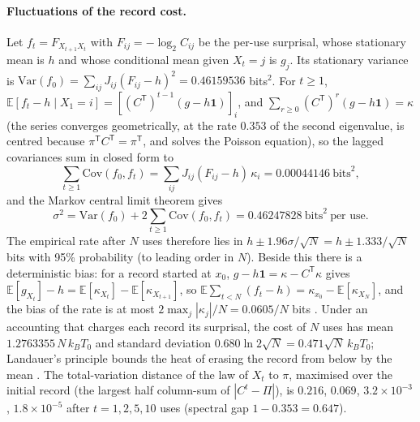 \documentclass[11pt]{article}
\theoremstyle{definition}\newtheorem{definition}[theorem]{Definition}
\theoremstyle{remark}\newtheorem{remark}[theorem]{Remark}
\begin{document}
\paragraph{Fluctuations of the record cost.} Let $f_t=F_{X_{t+1}X_t}$ with $F_{ij}=-\log_2C_{ij}$ be the per-use surprisal, whose stationary mean is $h$ and whose conditional mean given $X_t=j$ is $g_j$. Its stationary variance is $\mathrm{Var}(f_0)=\sum_{ij}J_{ij}(F_{ij}-h)^2=0.46159536$ bits$^2$. For $t\ge1$, $\mathbb E[f_t-h\mid X_1=i]=[(C^{\mathsf T})^{t-1}(g-h\mathbf 1)]_i$, and $\sum_{r\ge0}(C^{\mathsf T})^r(g-h\mathbf 1)=\kappa$ (the series converges geometrically, at the rate $0.353$ of the second eigenvalue, is centred because $\pi^{\mathsf T}C^{\mathsf T}=\pi^{\mathsf T}$, and solves the Poisson equation), so the lagged covariances sum in closed form to
\[
\sum_{t\ge1}\mathrm{Cov}(f_0,f_t)=\sum_{ij}J_{ij}(F_{ij}-h)\,\kappa_i=0.00044146\ \text{bits}^2,
\]
and the Markov central limit theorem \cite{MeynTweedie} gives
\[
\sigma^2=\mathrm{Var}(f_0)+2\sum_{t\ge1}\mathrm{Cov}(f_0,f_t)=0.46247828\ \text{bits}^2\ \text{per use}.
\]
The empirical rate after $N$ uses therefore lies in $h\pm1.96\sigma/\sqrt N=h\pm1.333/\sqrt N$ bits with 95\% probability (to leading order in $N$). Beside this there is a deterministic bias: for a record started at $x_0$, $g-h\mathbf 1=\kappa-C^{\mathsf T}\kappa$ gives $\mathbb E[g_{X_t}]-h=\mathbb E[\kappa_{X_t}]-\mathbb E[\kappa_{X_{t+1}}]$, so $\mathbb E\sum_{t<N}(f_t-h)=\kappa_{x_0}-\mathbb E[\kappa_{X_N}]$, and the bias of the rate is at most $2\max_j|\kappa_j|/N=0.0605/N$ bits \cite{Singh}. Under an accounting that charges each record its surprisal, the cost of $N$ uses has mean $1.2763355\,N\,k_BT_0$ and standard deviation $0.680\ln2\sqrt N=0.471\sqrt N\,k_BT_0$; Landauer's principle bounds the heat of erasing the record from below by the mean \cite{Landauer,ReebWolf,delRio}. The total-variation distance of the law of $X_t$ to $\pi$, maximised over the initial record (the largest half column-sum of $|C^t-\Pi|$), is $0.216$, $0.069$, $3.2\times10^{-3}$, $1.8\times10^{-5}$ after $t=1,2,5,10$ uses (spectral gap $1-0.353=0.647$).
\end{document}
